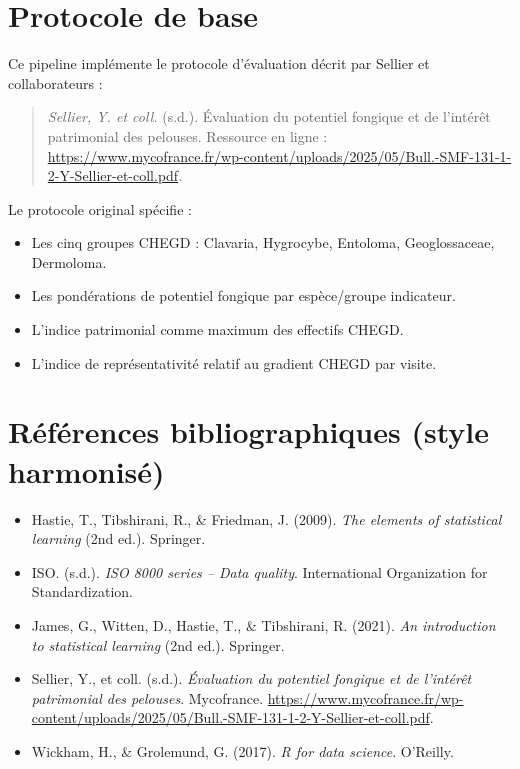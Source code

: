 \documentclass[11pt,a4paper]{article}
\begin{document}
\section{Protocole de base}
Ce pipeline implémente le protocole d'évaluation décrit par Sellier et collaborateurs :

\begin{quote}
  \textit{Sellier, Y. et coll.} (s.d.). Évaluation du potentiel fongique et de l'intérêt patrimonial des pelouses.
  Ressource en ligne : \url{https://www.mycofrance.fr/wp-content/uploads/2025/05/Bull.-SMF-131-1-2-Y-Sellier-et-coll.pdf}.
\end{quote}

Le protocole original spécifie : 
\begin{itemize}[leftmargin=1.2cm]
  \item Les cinq groupes CHEGD : Clavaria, Hygrocybe, Entoloma, Geoglossaceae, Dermoloma.
  \item Les pondérations de potentiel fongique par espèce/groupe indicateur.
  \item L'indice patrimonial comme maximum des effectifs CHEGD.
  \item L'indice de représentativité relatif au gradient CHEGD par visite.
\end{itemize}

\section{Références bibliographiques (style harmonisé)}
\begin{itemize}[leftmargin=1.2cm]
  \item Hastie, T., Tibshirani, R., \& Friedman, J. (2009). \textit{The elements of statistical learning} (2nd ed.). Springer.
  \item ISO. (s.d.). \textit{ISO 8000 series -- Data quality}. International Organization for Standardization.
  \item James, G., Witten, D., Hastie, T., \& Tibshirani, R. (2021). \textit{An introduction to statistical learning} (2nd ed.). Springer.
  \item Sellier, Y., et coll. (s.d.). \textit{Évaluation du potentiel fongique et de l'intérêt patrimonial des pelouses}. Mycofrance. \url{https://www.mycofrance.fr/wp-content/uploads/2025/05/Bull.-SMF-131-1-2-Y-Sellier-et-coll.pdf}.
  \item Wickham, H., \& Grolemund, G. (2017). \textit{R for data science}. O'Reilly.
\end{itemize}
\end{document}
